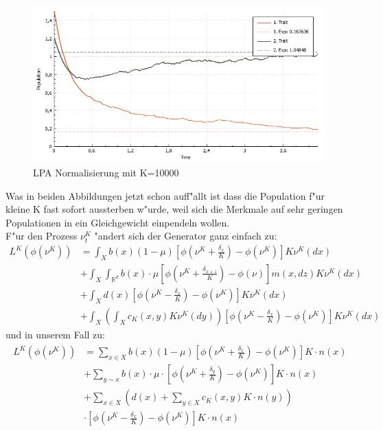 \documentclass[11pt, a4paper, german]{article}
\theoremstyle{plain}
\begin{document}
	\begin{figure}[H]
		\centering
		\includegraphics[width=1\linewidth]{./Pictures/LPANormalisierungK10000}
		\caption[LPAK100]{LPA Normalisierung mit K=10000}
		\label{LPA Normalisierung K=10000}
	\end{figure}
	Was in beiden Abbildungen jetzt schon auff"allt ist dass die Population f"ur kleine K fast sofort aussterben w"urde, weil sich die Merkmale auf sehr geringen Populationen in ein Gleichgewicht einpendeln wollen.\\
	F"ur den Prozess $ \nu_t^K $ "andert sich der Generator ganz einfach zu:
	\begin{align*}
		L^K(\phi(\nu^K)) &= \int_{X} b(x)(1-\mu)\left[\phi\left(\nu^K + \frac{\delta_x}{K}\right) - \phi(\nu^K)\right]K\nu^K(dx)\\
			  &+ \int_{X}\int_{\mathbb{R}^d} b(x) \cdot \mu \left[\phi\left(\nu^K + \frac{\delta_{x+z}}{K}\right) - \phi(\nu)\right] m(x,dz) K \nu^K(dx)\\
		  	  &+ \int_{X} d(x)\left[\phi\left(\nu^K - \frac{\delta_x}{K}\right) - \phi(\nu^K)\right]K\nu^K(dx)\\
		 	  &+ \int_{X} \left( \int_{X} c_K(x,y) K \nu^K(dy) \right) \left[\phi(\nu^K - \frac{\delta_x}{K}) - \phi(\nu^K)\right]K\nu^K(dx)
	\end{align*}
	und in unserem Fall zu:
	\begin{align}
	\begin{split}
			L^K(\phi(\nu^K)) &= \sum_{x \in X} b(x)(1-\mu)\left[\phi\left(\nu^K + \frac{\delta_x}{K}\right) - \phi(\nu^K)\right]K \cdot n(x)\\
			&+ \sum_{y \sim x}b(x) \cdot \mu \cdot 
		 \left[\phi\left(\nu^K + \frac{\delta_y}{K}\right) - \phi(\nu^K)\right]K \cdot n(x)\\		 
			&+ \sum_{x \in X} \left(d(x) + \sum_{y \in X} c_K(x,y) K \cdot n(y)\right)\\
			&\cdot \left[\phi\left(\nu^K - \frac{\delta_x}{K}\right) - \phi(\nu^K)\right]K \cdot n(x) \label{GeneratorDiskretK}
	\end{split}
	\end{align}
\end{document}
